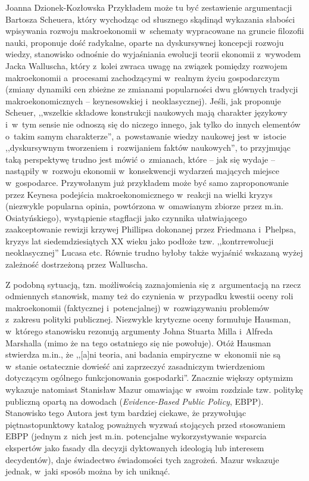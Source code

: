 \begin{recplenv}{Joanna Dzionek-Kozłowska}
Przykładem może tu być zestawienie argumentacji Bartosza Scheuera, który wychodząc od słusznego skądinąd wykazania
słabości wpisywania rozwoju makroekonomii w~schematy wypracowane na gruncie filozofii nauki, proponuje dość
radykalne, oparte na dyskursywnej koncepcji rozwoju wiedzy, stanowisko odnośnie do wyjaśniania ewolucji teorii ekonomii
z~wywodem Jacka Walluscha, który z~kolei zwraca uwagę na związek pomiędzy rozwojem makroekonomii a~procesami
zachodzącymi w~realnym życiu gospodarczym (zmiany dynamiki cen zbieżne ze zmianami popularności dwu głównych tradycji
makroekonomicznych -- keynesowskiej i~neoklasycznej). Jeśli, jak proponuje Scheuer, ,,wszelkie składowe konstrukcji
naukowych mają charakter językowy i~w~tym sensie nie odnoszą się do niczego innego, jak tylko do innych
elementów o~takim samym charakterze'', a~powstawanie wiedzy naukowej jest w~istocie ,,dyskursywnym tworzeniem i~rozwijaniem faktów
naukowych'', to przyjmując taką perspektywę trudno jest mówić o~zmianach, które -- jak się wydaje -- nastąpiły w~rozwoju
ekonomii w~konsekwencji wydarzeń mających miejsce w~gospodarce. Przywołanym już przykładem może być samo zaproponowanie
przez Keynesa podejścia makroekonomicznego w~reakcji na wielki kryzys (niezwykle popularna opinia,
powtórzona w~omawianym zbiorze przez m.in. Osiatyńskiego), wystąpienie stagflacji jako czynnika
ułatwiającego zaakceptowanie rewizji
krzywej Phillipsa dokonanej przez Friedmana i~Phelpsa, kryzys lat siedemdziesiątych XX wieku jako podłoże tzw.
,,kontrrewolucji neoklasycznej'' Lucasa etc. Równie trudno byłoby także wyjaśnić wskazaną wyżej zależność dostrzeżoną
przez Walluscha.

\enlargethispage{.5\baselineskip}

Z podobną sytuacją, tzn. możliwością zaznajomienia się z~argumentacją na rzecz odmiennych stanowisk, mamy też do
czynienia w~przypadku kwestii oceny roli makroekonomii (faktycznej i~potencjalnej) w~rozwiązywaniu problemów z~zakresu
polityki publicznej. Niezwykle krytyczne oceny formułuje Hausman, w~którego stanowisku rezonują
argumenty Johna Stuarta Milla i~Alfreda Marshalla (mimo że na tego ostatniego się nie powołuje). Otóż Hausman stwierdza
m.in., że ,,[a]ni teoria, ani badania empiryczne w~ekonomii nie są w~stanie ostatecznie dowieść ani zaprzeczyć
zasadniczym twierdzeniom dotyczącym ogólnego funkcjonowania gospodarki''. Znacznie większy optymizm wykazuje natomiast
Stanisław Mazur omawiając w~swoim rozdziale tzw. politykę publiczną opartą na dowodach (\textit{Evidence-Based Public
Policy}, EBPP). Stanowisko tego Autora jest tym bardziej ciekawe, że przywołując piętnastopunktowy katalog poważnych wyzwań
stojących przed stosowaniem EBPP (jednym z~nich jest m.in. potencjalne wykorzystywanie
wsparcia ekspertów jako fasady dla decyzji dyktowanych ideologią lub interesem decydentów), daje świadectwo świadomości
tych zagrożeń. Mazur wskazuje jednak, w~jaki sposób można by ich uniknąć.


\end{recplenv}
